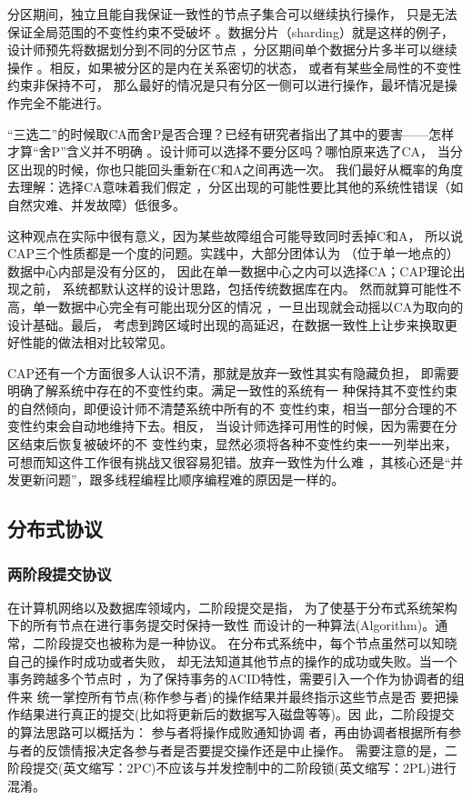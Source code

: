 分区期间，独立且能自我保证一致性的节点子集合可以继续执行操作，
只是无法保证全局范围的不变性约束不受破坏
。数据分片（sharding）就是这样的例子，
设计师预先将数据划分到不同的分区节点
，分区期间单个数据分片多半可以继续操作
。相反，如果被分区的是内在关系密切的状态，
或者有某些全局性的不变性约束非保持不可，
那么最好的情况是只有分区一侧可以进行操作，最坏情况是操作完全不能进行。

“三选二”的时候取CA而舍P是否合理？已经有研究者指出了其中的要害——怎样才算“舍P”含义并不明确
。设计师可以选择不要分区吗？哪怕原来选了CA，
当分区出现的时候，你也只能回头重新在C和A之间再选一次。
我们最好从概率的角度去理解：选择CA意味着我们假定
，分区出现的可能性要比其他的系统性错误（如自然灾难、并发故障）低很多。

这种观点在实际中很有意义，因为某些故障组合可能导致同时丢掉C和A，
所以说CAP三个性质都是一个度的问题。实践中，大部分团体认为
（位于单一地点的）数据中心内部是没有分区的，
因此在单一数据中心之内可以选择CA；CAP理论出现之前，
系统都默认这样的设计思路，包括传统数据库在内。
然而就算可能性不高，单一数据中心完全有可能出现分区的情况
，一旦出现就会动摇以CA为取向的设计基础。最后，
考虑到跨区域时出现的高延迟，在数据一致性上让步来换取更好性能的做法相对比较常见。

CAP还有一个方面很多人认识不清，那就是放弃一致性其实有隐藏负担，
即需要明确了解系统中存在的不变性约束。满足一致性的系统有一
种保持其不变性约束的自然倾向，即便设计师不清楚系统中所有的不
变性约束，相当一部分合理的不变性约束会自动地维持下去。相反，
当设计师选择可用性的时候，因为需要在分区结束后恢复被破坏的不
变性约束，显然必须将各种不变性约束一一列举出来，
可想而知这件工作很有挑战又很容易犯错。放弃一致性为什么难
，其核心还是“并发更新问题”，跟多线程编程比顺序编程难的原因是一样的。
\subsection{分布式协议}
\subsubsection{两阶段提交协议}
在计算机网络以及数据库领域内，二阶段提交是指，
为了使基于分布式系统架构下的所有节点在进行事务提交时保持一致性
而设计的一种算法(Algorithm)。通常，二阶段提交也被称为是一种协议。
在分布式系统中，每个节点虽然可以知晓自己的操作时成功或者失败，
却无法知道其他节点的操作的成功或失败。当一个事务跨越多个节点时
，为了保持事务的ACID特性，需要引入一个作为协调者的组件来
统一掌控所有节点(称作参与者)的操作结果并最终指示这些节点是否
要把操作结果进行真正的提交(比如将更新后的数据写入磁盘等等)。因
此，二阶段提交的算法思路可以概括为： 参与者将操作成败通知协调
者，再由协调者根据所有参与者的反馈情报决定各参与者是否要提交操作还是中止操作。
需要注意的是，二阶段提交(英文缩写：2PC)不应该与并发控制中的二阶段锁(英文缩写：2PL)进行混淆。

